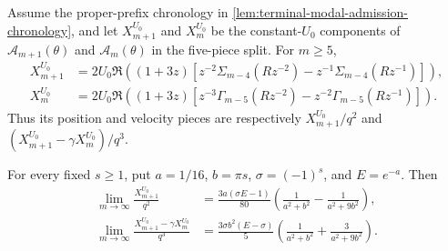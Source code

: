 \begin{lemma}
\label{lem:terminal-modal-constant-u-sum}
Assume the proper-prefix chronology in
\cref{lem:terminal-modal-admission-chronology}, and let
$X_{m+1}^{U_0}$ and $X_m^{U_0}$ be the constant-$U_0$ components of
$\mathcal A_{m+1}(\theta)$ and $\mathcal A_m(\theta)$ in the five-piece
split.  For $m\geq5$,
\begin{align}
 X_{m+1}^{U_0}
 &=2U_0\Re\left((1+3z)\left[
 z^{-2}\Sigma_{m-4}(Rz^{-2})
 -z^{-1}\Sigma_{m-4}(Rz^{-1})\right]\right),
 \label{eq:terminal-modal-constant-u-position}\\
 X_m^{U_0}
 &=2U_0\Re\left((1+3z)\left[
 z^{-3}\Gamma_{m-5}(Rz^{-2})
 -z^{-2}\Gamma_{m-5}(Rz^{-1})\right]\right).
 \label{eq:terminal-modal-constant-u-previous}
\end{align}
Thus its position and velocity pieces are respectively
$X_{m+1}^{U_0}/q^2$ and
$(X_{m+1}^{U_0}-\gamma X_m^{U_0})/q^3$.

For every fixed $s\geq1$, put $a=1/16$, $b=\pi s$,
$\sigma=(-1)^s$, and $E=e^{-a}$.  Then
\begin{align}
 \lim_{m\to\infty}\frac{X_{m+1}^{U_0}}{q^2}
 &=\frac{3a(\sigma E-1)}{80}
 \left(\frac1{a^2+b^2}-\frac1{a^2+9b^2}\right),
 \label{eq:terminal-modal-constant-u-position-limit}\\
 \lim_{m\to\infty}
 \frac{X_{m+1}^{U_0}-\gamma X_m^{U_0}}{q^3}
 &=\frac{3\sigma b^2(E-\sigma)}5
 \left(\frac1{a^2+b^2}+\frac3{a^2+9b^2}\right).
 \label{eq:terminal-modal-constant-u-velocity-limit}
\end{align}
\end{lemma}

